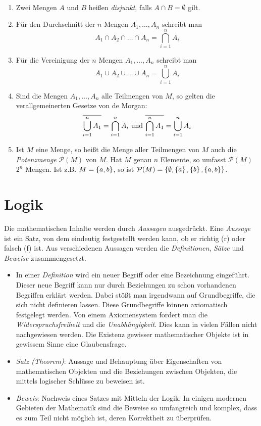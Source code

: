 \begin{note}~
\begin{enumerate}
\item Zwei Mengen $A$ und $B$ heißen \emph{disjunkt}, falls $A \cap B = \emptyset$ gilt.
\item Für den Durchschnitt der $n$ Mengen $A_1, \dots, A_n$ schreibt man \[A_1 \cap A_2 \cap \dots \cap A_n = \bigcap_{i = 1}^{n} A_i\]
\item Für die Vereinigung der $n$ Mengen $A_1, \dots, A_n$ schreibt man \[A_1 \cup A_2 \cup \dots \cup A_n = \bigcup_{i = 1}^{n} A_i\]
\item Sind die Mengen $A_1, \dots, A_n$ alle Teilmengen von $M$, so gelten die verallgemeinerten Gesetze von de Morgan:
	\[\overline{\bigcup_{i = 1}^{n} A_1} = \bigcap_{i = 1}^{n} \bar{A_i}
	\text{ und }
	\overline{\bigcap_{i = 1}^{n} A_1} = \bigcup_{i = 1}^{n} \bar{A_i}\]

\item Ist $M$ eine Menge, so heißt die Menge aller Teilmengen von $M$ auch die \emph{Potenzmenge} $\mathcal{P}(M)$ von $M$. Hat $M$ genau $n$ Elemente, so umfasst $\mathcal{P}(M)$ $2^n$ Mengen. Ist \ac{z.B.} $M = \left\{a, b\right\}$, so ist $\mathcal{P}(M) = \left\{\emptyset, \left\{a\right\}, \left\{b\right\}, \left\{a, b\right\}\right\}$.
\end{enumerate}
\end{note}

\chapter{Logik}
Die mathematischen Inhalte werden durch \emph{Aussagen} ausgedrückt. Eine \emph{Aussage} ist ein Satz, von dem eindeutig festgestellt werden kann, ob er richtig (r) oder falsch (f) ist. Aus verschiedenen Aussagen werden die \emph{Definitionen}, \emph{Sätze} und \emph{Beweise} zusammengesetzt.
\begin{itemize}
\item In einer \emph{Definition} wird ein neuer Begriff oder eine Bezeichnung eingeführt. Dieser neue Begriff kann nur durch Beziehungen zu schon vorhandenen Begriffen erklärt werden. Dabei stößt man irgendwann auf Grundbegriffe, die sich nicht definieren lassen. Diese Grundbegriffe können axiomatisch festgelegt werden. Von einem Axiomensystem fordert man die \emph{Widerspruchsfreiheit} und die \emph{Unabhängigkeit}. Dies kann in vielen Fällen nicht nachgewiesen werden. Die Existenz gewisser mathematischer Objekte ist in gewissem Sinne eine Glaubensfrage.
\item \emph{Satz (Theorem)}: Aussage und Behauptung über Eigenschaften von mathematischen Objekten und die Beziehungen zwischen Objekten, die mittels logischer Schlüsse zu beweisen ist.
\item \emph{Beweis}: Nachweis eines Satzes mit Mitteln der Logik. In einigen modernen Gebieten der Mathematik sind die Beweise so umfangreich und komplex, dass es zum Teil nicht möglich ist, deren Korrektheit zu überprüfen.
\end{itemize}

